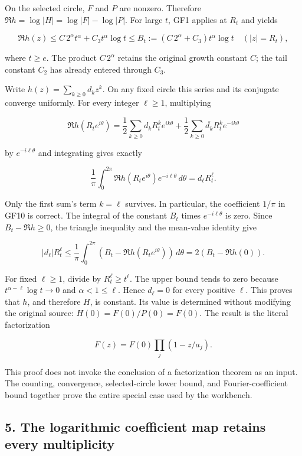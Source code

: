 On the selected circle, \(F\) and \(P\) are nonzero. Therefore \(\Re h=\log|H|=\log|F|-\log|P|\). For large \(t\), GF1 applies at \(R_t\) and yields

\[
\Re h(z)\le C\,2^\alpha t^\alpha+C_3t^\alpha\log t
\le B_t:=(C\,2^\alpha+C_3)t^\alpha\log t
\quad(|z|=R_t),
\tag{GFR16}
\]

where \(t\ge e\). The product \(C\,2^\alpha\) retains the original growth constant \(C\); the tail constant \(C_2\) has already entered through \(C_3\).

Write \(h(z)=\sum_{k\ge0}d_kz^k\). On any fixed circle this series and its conjugate converge uniformly. For every integer \(\ell\ge1\), multiplying

\[
\Re h(R_te^{i\theta})=
\frac12\sum_{k\ge0}d_kR_t^ke^{ik\theta}
+\frac12\sum_{k\ge0}\overline{d_k}R_t^ke^{-ik\theta}
\]

by \(e^{-i\ell\theta}\) and integrating gives exactly

\[
\frac1\pi\int_0^{2\pi}\Re h(R_te^{i\theta})e^{-i\ell\theta}\,d\theta
=d_\ell R_t^\ell.
\tag{GFR17}
\]

Only the first sum's term \(k=\ell\) survives. In particular, the coefficient \(1/\pi\) in GF10 is correct. The integral of the constant \(B_t\) times \(e^{-i\ell\theta}\) is zero. Since \(B_t-\Re h\ge0\), the triangle inequality and the mean-value identity give

\[
|d_\ell|R_t^\ell
\le\frac1\pi\int_0^{2\pi}(B_t-\Re h(R_te^{i\theta}))\,d\theta
=2(B_t-\Re h(0)).
\tag{GFR18}
\]

For fixed \(\ell\ge1\), divide by \(R_t^\ell\ge t^\ell\). The upper bound tends to zero because \(t^{\alpha-\ell}\log t\to0\) and \(\alpha<1\le\ell\). Hence \(d_\ell=0\) for every positive \(\ell\). This proves that \(h\), and therefore \(H\), is constant. Its value is determined without modifying the original source: \(H(0)=F(0)/P(0)=F(0)\). The result is the literal factorization

\[
F(z)=F(0)\prod_j(1-z/a_j).
\tag{GFR19}
\]

This proof does not invoke the conclusion of a factorization theorem as an input. The counting, convergence, selected-circle lower bound, and Fourier-coefficient bound together prove the entire special case used by the workbench.

\subsection{5. The logarithmic coefficient map retains every multiplicity}\label{the-logarithmic-coefficient-map-retains-every-multiplicity}

